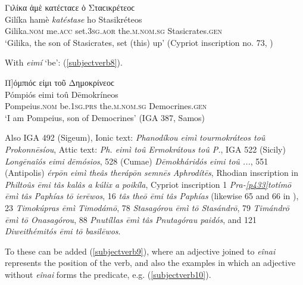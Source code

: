 \begin{exe}
\ex Γιλίκα ἁμὲ κατέϲταϲε ὁ Σταϲικρέτεοϲ\\
\gll Gilíka hamè \emph{katéstase} ho Stasikréteos\\
Gilika.\textsc{nom} me.\textsc{acc} set.\textsc{3sg.aor} the.\textsc{m.nom.sg} Stasicrates.\textsc{gen}\\
\trans `Gilika, the son of Stasicrates, set (this) up' (Cypriot inscription no. 73, \citealp{Deecke1884}) 
\label{subjectverb7}
\end{exe}

With \textit{eimí} `be': (\ref{subjectverb8}).

\begin{exe}
\ex {[}Π{]}όμπιόϲ εἰμι τοῦ Δημοκρίνεοϲ\\
\gll Pómpiós eimi toû Dēmokríneos\\
Pompeius.\textsc{nom} be.\textsc{1sg.prs} the.\textsc{m.nom.sg} Democrines.\textsc{gen}\\
\trans `I am Pompeius, son of Democrines' (IGA 387, Samos) 
\label{subjectverb8}
\end{exe}

Also IGA 492 (Sigeum), Ionic text: \textit{Phanodíkou \emph{eimì} tourmokráteos toû Prokonnēsíou}, Attic text: \textit{Ph. \emph{eimì} toû Ermokrátous toû P.}, IGA 522 (Sicily) \textit{Longēnaîós \emph{eimi} dēmósios}, 528 (Cumae) \textit{Dēmokháridós \emph{eimi} toû ...}, 551 (Antipolis) \textit{érpōn \emph{eimì} theâs therápōn semnēs Aphrodítēs}, Rhodian inscription in \citet[49]{Kirchhoff1887} \textit{Philtoûs \emph{ēmi} tâs kalâs a kúlix a poikíla}, Cypriot inscription 1 \citep{Deecke1884} \textit{Pra-}\hyperlink{p433}{\emph{[p433]}}\textit{totímō \emph{ēmì} tâs Paphías tō ierēwos}, 16 \textit{tâs theō \emph{ēmi} tâs Paphías} (likewise 65 and 66 in \citealp[46]{Hoffmann1891}), 23 \textit{Timokúpras \emph{ēmì} Timodámō}, \citet{Hoffmann1891} 78 \textit{Stasagórou \emph{ēmì} tō Stasándrō}, 79 \textit{Timándrō \emph{ēmì} tō Onasagórou}, 88 \textit{Pnutíllas \emph{ēmì} tâs Pnutagórau paidós}, and 121 \textit{Diweithémitós \emph{ēmi} tō basilēwos}.

To these can be added (\ref{subjectverb9}), where an adjective joined to \emph{eînai} represents the position of the verb, and also the examples in which an adjective without \emph{eînai} forms the predicate, e.g. (\ref{subjectverb10}).

